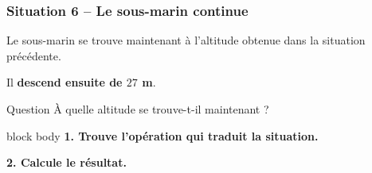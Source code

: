 \documentclass[aspectratio=169]{beamer}
\newcommand{\consigne}{%
\begin{beamercolorbox}[
  rounded=true,
  sep=0.8em,
  wd=\textwidth
]{block body}
\centering
\textbf{1. Trouve l'opération qui traduit la situation.}

\medskip

\textbf{2. Calcule le résultat.}
\end{beamercolorbox}
}
\begin{document}
\begin{frame}
\frametitle{Situation 6 -- Le sous-marin continue}

Le sous-marin se trouve maintenant à l'altitude obtenue
dans la situation précédente.

\medskip

Il \textbf{descend ensuite de \(27\) m}.

\vspace{0.5cm}

\begin{block}{Question}
À quelle altitude se trouve-t-il maintenant ?
\end{block}

\vfill

\consigne

\end{frame}
\end{document}
